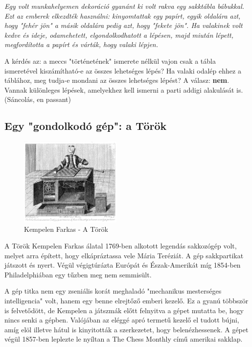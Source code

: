 \documentclass[twoside, a4paper, 12pt]{article}
\begin{document}
\textit{Egy volt munkahelyemen dekoráció gyanánt ki volt rakva egy sakktábla bábukkal. Ezt az emberek elkezdték használni: kinyomtattak egy papírt, egyik oldalára azt, hogy "fehér jön" a másik oldalára pedig azt, hogy "fekete jön". Ha valakinek volt kedve és ideje, odamehetett, elgondolkodhatott a lépésen, majd miután lépett, megfordította a papírt és várták, hogy valaki lépjen.}

A kérdés az: a meccs "történetének" ismerete nélkül vajon csak a tábla ismeretével kiszámítható-e az összes lehetséges lépés? Ha valaki odalép ehhez a táblához, meg tudja-e mondani az összes lehetséges lépést? A válasz: \textbf{nem}. Vannak különleges lépések, amelyekhez kell ismerni a parti addigi alakulását is. (Sáncolás, en passant)

\subsection{Egy "gondolkodó gép": a Török}
\begin{figure}
	\caption{Kempelen Farkas - A Török}
	\label{fig:the_turk}
	\includegraphics[width=5.0cm]{img/the_turk}
\end{figure}
A Török Kempelen Farkas álatal 1769-ben alkotott legendás sakkozógép volt, melyet arra épített, hogy elkápráztassa vele Mária Teréziát. A gép sakkpartikat játszott és nyert. Végül végigtúrázta Európát és Észak-Amerikát míg 1854-ben Philadelphiában egy tűzben meg nem semmisült. 

A gép titka nem egy zseniális korát meghaladó "mechanikus mesterséges intelligencia" volt, hanem egy benne elrejtőző emberi kezelő. Ez a gyanú többször is felvetődött, de Kempelen a játszmák előtt felnyitva a gépet mutatta be, hogy nincs senki a gépben. Valójában az eléggé apró termetű kezelő el tudott bújni, amíg elöl illetve hátul is kinyitották a szerkezetet, hogy belenézhessenek. A gépet végül 1857-ben leplezte le nyíltan a The Chess Monthly című amerikai sakklap.\cite{MechanicalTurkHu}\cite{MechanicalTurkEn}
\end{document}
